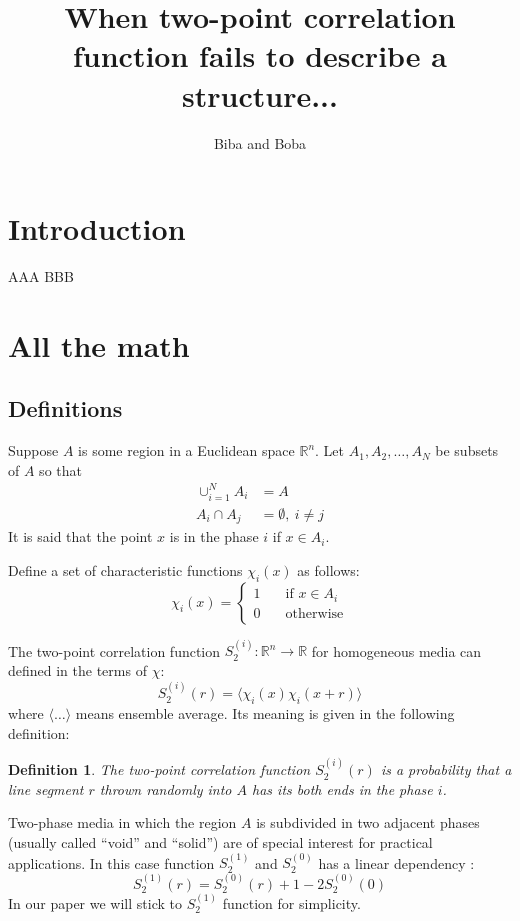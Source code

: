 \documentclass[12pt, a4paper]{article}
\newtheorem{definition}{Definition}
\begin{document}
\title{When two-point correlation function fails to describe a structure...}
\author{Biba and Boba}
\maketitle

\section{Introduction}
AAA BBB

\section{All the math}
\subsection{Definitions}
Suppose $A$ is some region in a Euclidean space $\mathbb{R}^n$. Let
$A_1, A_2, \dots, A_N$ be subsets of $A$ so that
\begin{align*}
  \cup_{i=1}^N A_i &= A \\
  A_i \cap A_j &= \emptyset, \ i \ne j
\end{align*}
It is said that the point $x$ is in the phase $i$ if $x \in A_i$.

Define a set of characteristic functions $\chi_i(x)$ as follows:
\begin{equation*}
  \chi_i(x) = \left\{
  \begin{array}{ll}
    1 & \quad \text{if $x \in A_i$} \\
    0 & \quad \text{otherwise}
  \end{array}
  \right.
\end{equation*}

The two-point correlation function
$S_2^{(i)}: \mathbb{R}^n \rightarrow \mathbb{R}$ for homogeneous media can
defined in the terms of $\chi$:
\begin{equation}
  S_2^{(i)}(r) = \langle \chi_i(x) \chi_i(x+r) \rangle
  \label{eq:s2}
\end{equation}
where $\langle \dots \rangle$ means ensemble average. Its meaning is given in
the following definition:
\begin{definition}
  The two-point correlation function $S_2^{(i)}(r)$ is a probability that a
  line segment $r$ thrown randomly into $A$ has its both ends in the phase $i$.
  \label{def:s2}
\end{definition}

Two-phase media in which the region $A$ is subdivided in two adjacent phases
(usually called ``void'' and ``solid'') are of special interest for practical
applications. In this case function $S_2^{(1)}$ and $S_2^{(0)}$ has a linear
dependency \cite{Torquato_book}:
\begin{equation*}
  S_2^{(1)}(r) = S_2^{(0)}(r) + 1 - 2S_2^{(0)}(0)
\end{equation*}
In our paper we will stick to $S_2^{(1)}$ function for simplicity.
\end{document}
